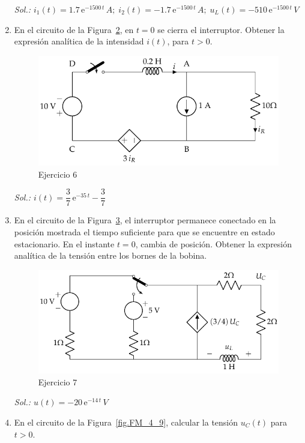 \begin{enumerate}
\begin{figure}[H]
    \label{fig.ej5_BT4}
  \end{figure}
  \emph{Sol.:
    $i_1(t)=1.7\,\mathrm{e}^{-1500\,t}\,A;\;i_2(t)=-1.7\,\mathrm{e}^{-1500\,t}\,A;\;
    u_L(t)=-510\,\mathrm{e}^{-1500\,t}\,V$}
\item En el circuito de la Figura~\ref{fig.ej6_BT4}, en $t = 0$ se
  cierra el interruptor. Obtener la expresión analítica de la
  intensidad $i(t)$, para $t > 0$.
  \begin{figure}[H]
    \centering \includegraphics{../figs/ej6_BT4.pdf}
    \caption{Ejercicio 6}
    \label{fig.ej6_BT4}
  \end{figure}
  \emph{Sol.: $i(t)=\dfrac{3}{7}\,\mathrm{e}^{-35\,t}-\dfrac{3}{7}$}
\item En el circuito de la Figura~\ref{fig.ej7_BT4}, el interruptor
  permanece conectado en la posición mostrada el tiempo suficiente
  para que se encuentre en estado estacionario. En el instante $t=0$,
  cambia de posición. Obtener la expresión analítica de la tensión
  entre los bornes de la bobina.
  \begin{figure}[H]
    \centering \includegraphics{../figs/ej7_BT4.pdf}
    \caption{Ejercicio 7}
    \label{fig.ej7_BT4}
  \end{figure}
  \emph{Sol.: $u(t)=-20\,\mathrm{e}^{-14\,t}\,V$}
\item En el circuito de la Figura~\ref{fig.FM_4_9}, calcular la tensión $u_C(t)$ para $t > 0$.\\

\end{enumerate}

